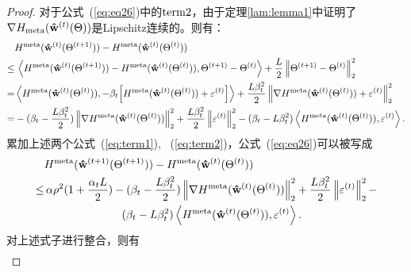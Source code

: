 \begin{proof}
对于公式~(\ref{eq:eq26})中的${\rm term 2}$，由于定理\ref{lam:lemma1}中证明了$\nabla H_{\rm meta}(\mathbf{\hat w}^{(t)}(\Theta))$是Lipschitz连续的。则有：
\begin{equation}
    \begin{aligned}
    \label{eq:term2}
    & H^{\rm meta}(\mathbf{\hat w}^{(t)}(\Theta^{(t+1)})) - 
    H^{\rm meta}(\mathbf{\hat w}^{(t)}(\Theta^{(t)})) \\
    \leq & \,  \left \langle  
    H^{\rm meta}(\mathbf{\hat w}^{(t)}(\Theta^{(t+1)})) - 
    H^{\rm meta}(\mathbf{\hat w}^{(t)}(\Theta^{(t)})), \Theta^{(t+1)} - \Theta^{(t)}
     \right \rangle  + \frac{L}{2} 
    \left\| \Theta^{(t+1)} - \Theta^{(t)} \right\|_2^2  \\
    = & \left \langle  
    H^{\rm meta}(\mathbf{\hat w}^{(t)}(\Theta^{(t)})), -\beta_t 
    \Big{[}  H^{\rm meta}(\mathbf{\hat w}^{(t)}(\Theta^{(t)})) + \varepsilon^{(t)}
    \Big{]}
     \right \rangle  + \frac{L \beta_t^2}{2} \left\| \nabla H^{\rm meta}(\mathbf{\hat w}^{(t)}(\Theta^{(t)})) + \varepsilon^{(t)} \right\|_2^2 \\
     = & -(\beta_t - \frac{L \beta_t^2}{2}) \left\| \nabla H^{\rm meta}(\mathbf{\hat w}^{(t)}(\Theta^{(t)})) \right\|_2^2 +
     \frac{L \beta_t^2}{2} \left\| \varepsilon^{(t)} \right\|_2^2 - (\beta_t - L\beta_t^2) \left\langle H^{\rm meta}(\mathbf{\hat w}^{(t)}(\Theta^{(t)})), \varepsilon^{(t)}  \right\rangle.
    \end{aligned}
\end{equation}
累加上述两个公式~(\ref{eq:term1}), ~(\ref{eq:term2})，公式~(\ref{eq:eq26})可以被写成
\begin{equation}
    \begin{aligned}
      &  H^{\rm meta}(\mathbf{\hat w}^{(t+1)}(\Theta^{(t+1)})) - 
    H^{\rm meta}(\mathbf{\hat w}^{(t)}(\Theta^{(t)})) \\
    \leq & \, \alpha \rho^2 (1 + \frac{\alpha_t L}{2}) - (\beta_t - \frac{L \beta_t^2}{2}) \left\| \nabla H^{\rm meta}(\mathbf{\hat w}^{(t)}(\Theta^{(t)})) \right\|_2^2 +
     \frac{L \beta_t^2}{2} \left\| \varepsilon^{(t)} \right\|_2^2 - \\ & \quad\quad\quad\quad\quad\quad\quad (\beta_t - L\beta_t^2) \left\langle H^{\rm meta}(\mathbf{\hat w}^{(t)}(\Theta^{(t)})), \varepsilon^{(t)}  \right\rangle. 
    \end{aligned}
\end{equation}
对上述式子进行整合，则有
\begin{equation}
    \begin{aligned}

\end{aligned}
\end{equation}
\end{proof}
